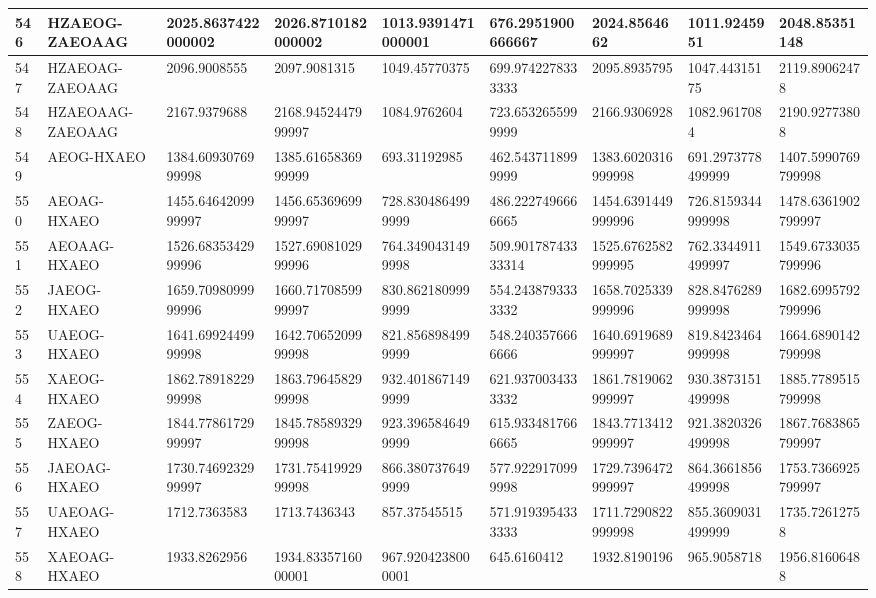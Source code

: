 {\begin{longtable}{|l|l|l|l|l|l|l|l|l|}
        546 & HZAEOG-ZAEOAAG & 2025.8637422000002 & 2026.8710182000002 & 1013.9391471000001 & 676.2951900666667 & 2024.8564662 & 1011.9245951 & 2048.85351148 \\ \hline
        547 & HZAEOAG-ZAEOAAG & 2096.9008555 & 2097.9081315 & 1049.45770375 & 699.9742278333333 & 2095.8935795 & 1047.44315175 & 2119.89062478 \\ \hline
        548 & HZAEOAAG-ZAEOAAG & 2167.9379688 & 2168.9452447999997 & 1084.9762604 & 723.6532655999999 & 2166.9306928 & 1082.9617084 & 2190.92773808 \\ \hline
        549 & AEOG-HXAEO & 1384.6093076999998 & 1385.6165836999999 & 693.31192985 & 462.5437118999999 & 1383.6020316999998 & 691.2973778499999 & 1407.5990769799998 \\ \hline
        550 & AEOAG-HXAEO & 1455.6464209999997 & 1456.6536969999997 & 728.8304864999999 & 486.2227496666665 & 1454.6391449999996 & 726.8159344999998 & 1478.6361902799997 \\ \hline
        551 & AEOAAG-HXAEO & 1526.6835342999996 & 1527.6908102999996 & 764.3490431499998 & 509.90178743333314 & 1525.6762582999995 & 762.3344911499997 & 1549.6733035799996 \\ \hline
        552 & JAEOG-HXAEO & 1659.7098099999996 & 1660.7170859999997 & 830.8621809999999 & 554.2438793333332 & 1658.7025339999996 & 828.8476289999998 & 1682.6995792799996 \\ \hline
        553 & UAEOG-HXAEO & 1641.6992449999998 & 1642.7065209999998 & 821.8568984999999 & 548.2403576666666 & 1640.6919689999997 & 819.8423464999998 & 1664.6890142799998 \\ \hline
        554 & XAEOG-HXAEO & 1862.7891822999998 & 1863.7964582999998 & 932.4018671499999 & 621.9370034333332 & 1861.7819062999997 & 930.3873151499998 & 1885.7789515799998 \\ \hline
        555 & ZAEOG-HXAEO & 1844.7786172999997 & 1845.7858932999998 & 923.3965846499999 & 615.9334817666665 & 1843.7713412999997 & 921.3820326499998 & 1867.7683865799997 \\ \hline
        556 & JAEOAG-HXAEO & 1730.7469232999997 & 1731.7541992999998 & 866.3807376499999 & 577.9229170999998 & 1729.7396472999997 & 864.3661856499998 & 1753.7366925799997 \\ \hline
        557 & UAEOAG-HXAEO & 1712.7363583 & 1713.7436343 & 857.37545515 & 571.9193954333333 & 1711.7290822999998 & 855.3609031499999 & 1735.72612758 \\ \hline
        558 & XAEOAG-HXAEO & 1933.8262956 & 1934.8335716000001 & 967.9204238000001 & 645.6160412 & 1932.8190196 & 965.9058718 & 1956.81606488 \\ \hline

\end{longtable}}
